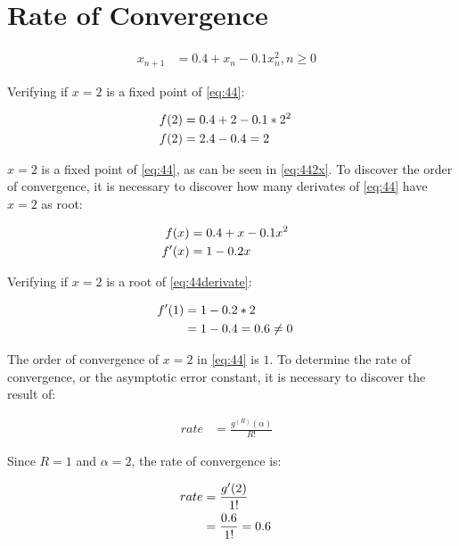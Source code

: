 \section{Rate of Convergence}

	\begin{align}
		x_{n+1} &= 0.4+x_{n}-0.1x_{n}^{2}, n \ge 0&
	\label{eq:44}
	\end{align}

	Verifying if $x=2$ is a fixed point of \cref{eq:44}:

	\begin{align}
		f(2) &= 0.4+2-0.1*2^{2}& \notag \\
		f(2) &= 2.4 -0.4 = 2&
	\label{eq:442x}
	\end{align}

	$x=2$ is a fixed point of \cref{eq:44}, as can be seen in \cref{eq:442x}. To discover the order of convergence, it is necessary to discover how many derivates of \cref{eq:44} have $x=2$ as root:

	\begin{align}
		f(x) &= 0.4+x-0.1x^{2}& \notag \\
		f'(x) &= 1 - 0.2x&
	\label{eq:44derivate}
	\end{align}

	Verifying if $x=2$ is a root of \cref{eq:44derivate}:

	\begin{align}
		f'(1) &= 1 - 0.2*2& \notag \\
		&= 1 - 0.4 = 0.6 \neq 0& \notag \\
	\label{eq:44derivate2x}
	\end{align}

	The order of convergence of $x = 2$ in \cref{eq:44} is $1$. To determine the rate of convergence, or the asymptotic error constant, it is necessary to discover the result of:

	\begin{align}
		rate &= \frac{g^{(R)}(\alpha)}{R!}&
	\label{eq:rate}
	\end{align}

	Since $R = 1$ and $\alpha = 2$, the rate of convergence is:

	\begin{align}
		rate &= \frac{g'(2)}{1!}& \notag \\
		&= \frac{0.6}{1!} = 0.6&
	\label{eq:44rate}
	\end{align}